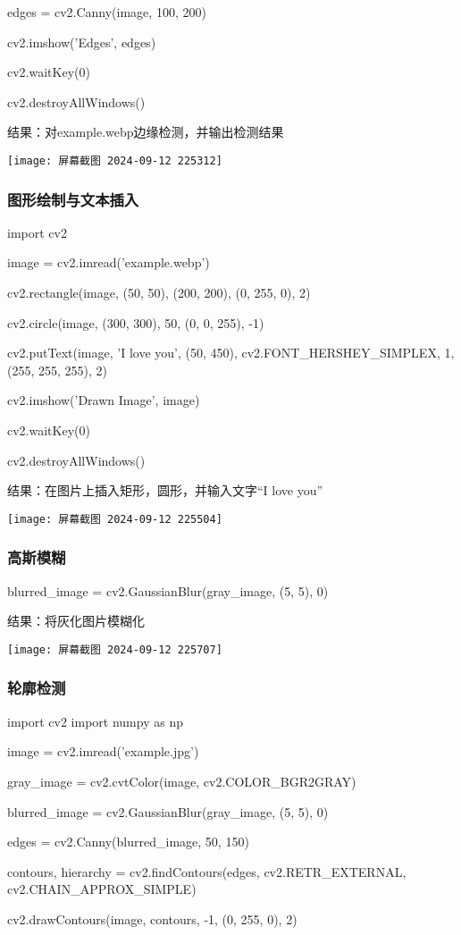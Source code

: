 \documentclass{ctexart}
\begin{document}
edges = cv2.Canny(image, 100, 200)

cv2.imshow('Edges', edges)

cv2.waitKey(0)

cv2.destroyAllWindows()

结果：对example.webp边缘检测，并输出检测结果

\texttt{[image: 屏幕截图 2024-09-12 225312]}
\subsubsection{图形绘制与文本插入}
import cv2

image = cv2.imread('example.webp')

cv2.rectangle(image, (50, 50), (200, 200), (0, 255, 0), 2)

cv2.circle(image, (300, 300), 50, (0, 0, 255), -1)

cv2.putText(image, 'I love you', (50, 450), cv2.FONT_HERSHEY_SIMPLEX, 1, (255, 255, 255), 2)

cv2.imshow('Drawn Image', image)

cv2.waitKey(0)

cv2.destroyAllWindows()

结果：在图片上插入矩形，圆形，并输入文字“I love you”

\texttt{[image: 屏幕截图 2024-09-12 225504]}
\subsubsection{高斯模糊}
blurred_image = cv2.GaussianBlur(gray_image, (5, 5), 0)

结果：将灰化图片模糊化

\texttt{[image: 屏幕截图 2024-09-12 225707]}
\subsubsection{轮廓检测}
import cv2
import numpy as np

image = cv2.imread('example.jpg')

gray_image = cv2.cvtColor(image, cv2.COLOR_BGR2GRAY)

blurred_image = cv2.GaussianBlur(gray_image, (5, 5), 0)

edges = cv2.Canny(blurred_image, 50, 150)

contours, hierarchy = cv2.findContours(edges, cv2.RETR_EXTERNAL, cv2.CHAIN_APPROX_SIMPLE)

cv2.drawContours(image, contours, -1, (0, 255, 0), 2)
\end{document}
